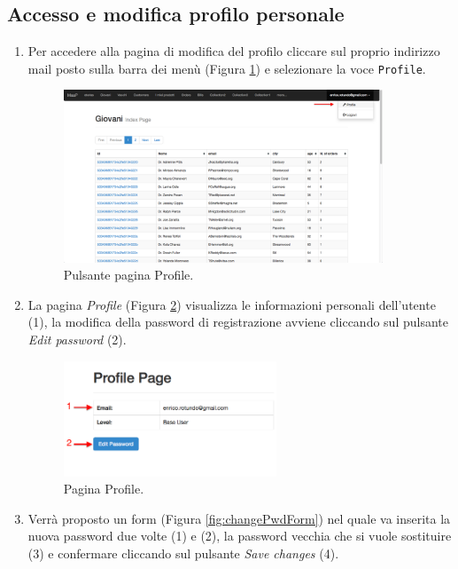 	\clearpage
	\subsection{Accesso e modifica profilo personale}
		\label{modificaprofilo}
		\begin{enumerate}

			\item Per accedere alla pagina di modifica del profilo cliccare sul proprio indirizzo mail posto sulla barra dei menù (Figura \ref{fig:profileButton}) e selezionare la voce \texttt{Profile}.

			\begin{figure}[H]
				\centering \includegraphics[width=0.9\textwidth]{img/profileButton.png}
			\caption{ \label{fig:profileButton} Pulsante pagina Profile.}
			\end{figure}

			\item La pagina \emph{Profile} (Figura \ref{fig:showProfile}) visualizza le informazioni personali dell'utente (1), la modifica della password di registrazione avviene cliccando sul pulsante \emph{Edit password} (2).

			\begin{figure}[H]
				\centering \includegraphics[width=0.6\textwidth]{img/showProfile.png}
			\caption{ \label{fig:showProfile} Pagina Profile.}
			\end{figure}

			\item Verrà proposto un form (Figura \ref{fig:changePwdForm}) nel quale va inserita la nuova password due volte (1) e (2), la password vecchia che si vuole sostituire (3) e confermare cliccando sul pulsante \emph{Save changes} (4).


\end{enumerate}
